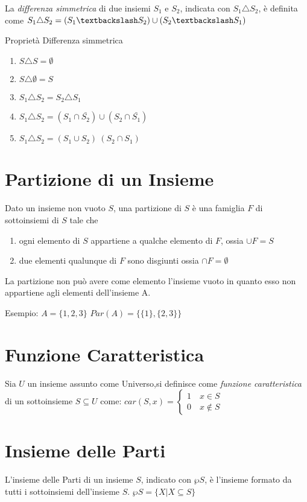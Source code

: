 La \textit{differenza simmetrica} di due insiemi $S_1$ e $S_2$, indicata con $S_1 \triangle S_2$,
è definita come $S_1 \triangle S_2 = (S_1 \textbackslash S_2) \cup (S_2 \textbackslash S_1) $

\begin{prop}
Proprietà Differenza simmetrica
\begin{enumerate}
  \item $S \triangle S = \emptyset$
  \item $S \triangle \emptyset = S$
  \item $S_1 \triangle S_2 = S_2 \triangle S_1$
  \item $S_1 \triangle S_2 = (S_1 \cap \bar{S_2}) \cup (S_2 \cap \bar{S_1})$
  \item $S_1 \triangle S_2 = (S_1 \cup S_2) \ (S_2 \cap S_1)$
\end{enumerate}
\end{prop}

\section{Partizione di un Insieme}
Dato un insieme non vuoto $S$, una partizione di $S$ è una famiglia $F$ di sottoinsiemi di $S$ tale che
\begin{enumerate}
    \item ogni elemento di $S$ appartiene a qualche elemento di $F$, ossia $\cup F = S$
    \item due elementi qualunque di $F$ sono disgiunti ossia $\cap F = \emptyset$
\end{enumerate}
La partizione non può avere come elemento l'insieme vuoto in quanto esso non
appartiene agli elementi dell'insieme A.

Esempio:
$A = \{ 1,2,3 \}$ \newline
$Par(A) = \{ \{ 1 \},\{2,3 \} \}$

\section{Funzione Caratteristica}
Sia $U$ un insieme assunto come Universo,si definisce come \emph{funzione caratteristica}
di un sottoinsieme $S \subseteq U$ come:
$car(S,x) = \begin{cases} 1 \quad x \in S \\ 0 \quad x \not \in S \end{cases}$

\section{Insieme delle Parti}
L'insieme delle Parti di un insieme $S$, indicato con $\wp S$, è l'insieme formato
da tutti i sottoinsiemi dell'insieme $S$. \newline
$\wp S = \{X | X \subseteq S\} $

